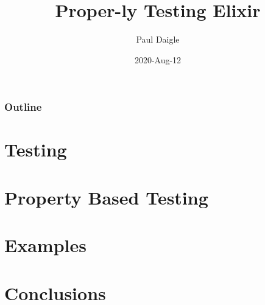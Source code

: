

\title[] %
{Proper-ly Testing Elixir}

\subtitle
{} %

\author[] %
{Paul Daigle}

\institute[] %
{ 
}


\date[] %
{2020-Aug-12}

\subject{}














\begin{frame}
  \titlepage
\end{frame}

\begin{frame}
  \frametitle{Outline}
  \tableofcontents
\end{frame}


\section{Testing}

\section{Property Based Testing}

\section{Examples}

\section{Conclusions}




